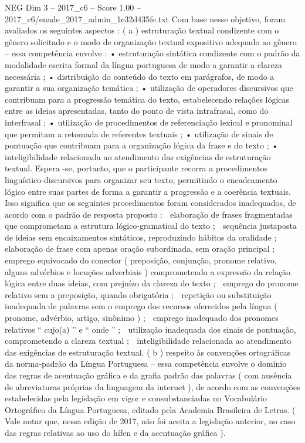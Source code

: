 \begin{textsample}{NEG Dim 3 – 2017\_c6 – Score 1.00 – 2017\_c6/enade\_2017\_admin\_1e32d435fe.txt}
Com base nesse objetivo, foram avaliados os seguintes aspectos : ( a ) estruturação textual condizente com o gênero solicitado e o modo de organização textual expositivo adequado ao gênero – essa competência envolve : • estruturação sintática condizente com o padrão da modalidade escrita formal da língua portuguesa de modo a garantir a clareza necessária ; • distribuição do conteúdo do texto em parágrafos, de modo a garantir a sua organização temática ; • utilização de operadores discursivos que contribuam para a progressão temática do texto, estabelecendo relações lógicas entre as ideias apresentadas, tanto do ponto de vista intrafrasal, como do interfrasal ; • utilização de procedimentos de referenciação lexical e pronominal que permitam a retomada de referentes textuais ; • utilização de sinais de pontuação que contribuam para a organização lógica da frase e do texto ; • inteligibilidade relacionada ao atendimento das exigências de estruturação textual.
Espera -se, portanto, que o participante recorra a procedimentos linguístico-discursivos para organizar seu texto, permitindo o encadeamento lógico entre suas partes de forma a garantir a progressão e a coerência textuais.
Isso significa que os seguintes procedimentos foram considerados inadequados, de acordo com o padrão de resposta proposto :  elaboração de frases fragmentadas que comprometam a estrutura lógico-gramatical do texto ;  sequência justaposta de ideias sem encaixamentos sintáticos, reproduzindo hábitos da oralidade ;  elaboração de frase com apenas oração subordinada, sem oração principal ;  emprego equivocado do conector ( preposição, conjunção, pronome relativo, alguns advérbios e locuções adverbiais ) comprometendo a expressão da relação lógica entre duas ideias, com prejuízo da clareza do texto ;  emprego do pronome relativo sem a preposição, quando obrigatória ;  repetição ou substituição inadequada de palavras sem o emprego dos recursos oferecidos pela língua ( pronome, advérbio, artigo, sinônimo ) ;  emprego inadequado dos pronomes relativos “ cujo(a) ” e “ onde ” ;  utilização inadequada dos sinais de pontuação, comprometendo a clareza textual ;  inteligibilidade relacionada ao atendimento das exigências de estruturação textual. ( b ) respeito às convenções ortográficas da norma-padrão da Língua Portuguesa – essa competência envolve o domínio das regras de acentuação gráfica e da grafia padrão das palavras ( com ausência de abreviaturas próprias da linguagem da internet ), de acordo com as convenções estabelecidas pela legislação em vigor e consubstanciadas no Vocabulário Ortográfico da Língua Portuguesa, editado pela Academia Brasileira de Letras. ( Vale notar que, nessa edição de 2017, não foi aceita a legislação anterior, no caso das regras relativas ao uso do hífen e da acentuação gráfica ).

\end{textsample}
